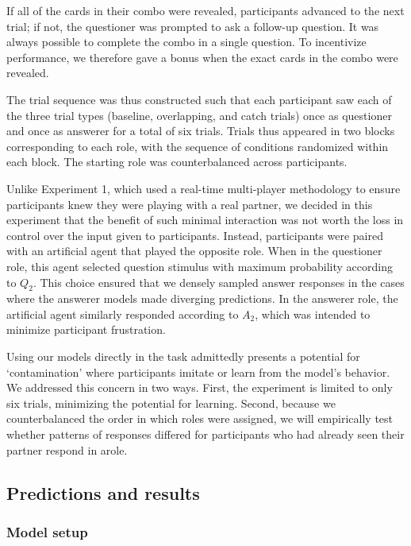 \documentclass[12pt, floatsintext, jou]{apa6}
\begin{document}
If all of the cards in their combo were revealed, participants advanced to the next trial; if not, the questioner was prompted to ask a follow-up question.
It was always possible to complete the combo in a single question.
To incentivize performance, we therefore gave a bonus when the exact cards in the combo were revealed. 

The trial sequence was thus constructed such that each participant saw each of the three trial types (baseline, overlapping, and catch trials) once as questioner and once as answerer for a total of six trials.
Trials thus appeared in two blocks corresponding to each role, with the sequence of conditions randomized within each block. 
The starting role was counterbalanced across participants.

Unlike Experiment 1, which used a real-time multi-player methodology to ensure participants knew they were playing with a real partner, we decided in this experiment that the benefit of such minimal interaction was not worth the loss in control over the input given to participants.
Instead, participants were paired with an artificial agent that played the opposite role.
When in the questioner role, this agent selected question stimulus with maximum probability according to $Q_2$. 
This choice ensured that we densely sampled answer responses in the cases where the answerer models made diverging predictions.
In the answerer role, the artificial agent similarly responded according to $A_2$, which was intended to minimize participant frustration.

Using our models directly in the task admittedly presents a potential for `contamination' where participants imitate or learn from the model's behavior. 
We addressed this concern in two ways. 
First, the experiment is limited to only six trials, minimizing the potential for learning.
Second, because we counterbalanced the order in which roles were assigned, we will empirically test whether patterns of responses differed for participants who had already seen their partner respond in arole.

\subsection{Predictions and results}

\subsubsection{Model setup}
\end{document}
